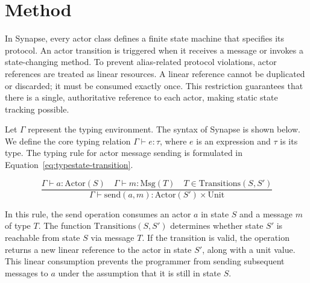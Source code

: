 \section{Method}
In Synapse, every actor class defines a finite state machine that specifies its protocol. An actor transition is triggered when it receives a message or invokes a state-changing method. To prevent alias-related protocol violations, actor references are treated as linear resources. A linear reference cannot be duplicated or discarded; it must be consumed exactly once. This restriction guarantees that there is a single, authoritative reference to each actor, making static state tracking possible.

Let $\Gamma$ represent the typing environment. The syntax of Synapse is shown below. We define the core typing relation $\Gamma \vdash e : \tau$, where $e$ is an expression and $\tau$ is its type. The typing rule for actor message sending is formulated in Equation~\ref{eq:typestate-transition}.

\begin{equation}
\label{eq:typestate-transition}
\frac{\Gamma \vdash a : \text{Actor}(S) \quad \Gamma \vdash m : \text{Msg}(T) \quad T \in \text{Transitions}(S, S')}{\Gamma \vdash \text{send}(a, m) : \text{Actor}(S') \times \text{Unit}}
\end{equation}

In this rule, the send operation consumes an actor $a$ in state $S$ and a message $m$ of type $T$. The function $\text{Transitions}(S, S')$ determines whether state $S'$ is reachable from state $S$ via message $T$. If the transition is valid, the operation returns a new linear reference to the actor in state $S'$, along with a unit value. This linear consumption prevents the programmer from sending subsequent messages to $a$ under the assumption that it is still in state $S$.

